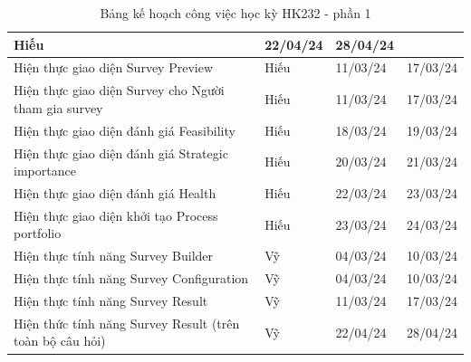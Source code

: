 \begin{table}[H]
{\begin{tabular}{|p{11cm}|p{1.75cm}|p{1.5cm}|p{1.5cm}|}
        { Hiếu} &
        { 22/04/24} &
        { 28/04/24} \\ \hline{ Hiện thực giao diện Survey Preview} &
        { Hiếu} &
        { 11/03/24} &
        { 17/03/24} \\ \hline
        { Hiện thực giao diện Survey cho Người tham gia survey} &
        { Hiếu} &
        { 11/03/24} &
        { 17/03/24} \\ \hline
        { Hiện thực giao diện đánh giá Feasibility} &
        { Hiếu} &
        { 18/03/24} &
        { 19/03/24} \\ \hline
        { Hiện thực giao diện đánh giá Strategic importance} &
        { Hiếu} &
        { 20/03/24} &
        { 21/03/24} \\ \hline
        { Hiện thực giao diện đánh giá Health} &
        { Hiếu} &
        { 22/03/24} &
        { 23/03/24} \\ \hline
        { Hiện thực giao diện khởi tạo Process portfolio} &
        { Hiếu} &
        { 23/03/24} &
        { 24/03/24} \\ \hline
        { Hiện thực tính năng Survey Builder} &
        { Vỹ} &
        { 04/03/24} &
        { 10/03/24} \\ \hline        
        { Hiện thực tính năng Survey Configuration} &
        { Vỹ} &
        { 04/03/24} &
        { 10/03/24} \\ \hline
        { Hiện thực tính năng Survey Result} &
        { Vỹ} &
        { 11/03/24} &
        { 17/03/24} \\ \hline
        { Hiện thức tính năng Survey Result (trên toàn bộ câu hỏi)} &
        { Vỹ} &
        { 22/04/24} &
        { 28/04/24} \\ \hline
    \end{tabular}%
    }
    \caption{Bảng kế hoạch công việc học kỳ HK232 - phần 1}
\end{table}

